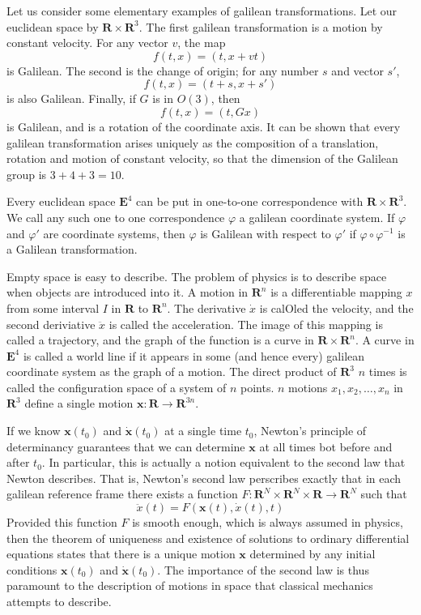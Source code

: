 Let us consider some elementary examples of galilean transformations. Let our euclidean space by $\mathbf{R} \times \mathbf{R}^3$. The first galilean transformation is a motion by constant velocity. For any vector $v$, the map
%
\[ f(t,x) = (t,x + vt) \]
%
is Galilean. The second is the change of origin; for any number $s$ and vector $s'$,
%
\[ f(t,x) = (t + s, x + s') \]
%
is also Galilean. Finally, if $G$ is in $O(3)$, then
%
\[ f(t,x) = (t, Gx) \]
%
is Galilean, and is a rotation of the coordinate axis. It can be shown that every galilean transformation arises uniquely as the composition of a translation, rotation and motion of constant velocity, so that the dimension of the Galilean group is $3 + 4 + 3 = 10$.

Every euclidean space $\mathbf{E}^4$ can be put in one-to-one correspondence with $\mathbf{R} \times \mathbf{R}^3$. We call any such one to one correspondence $\varphi$ a galilean coordinate system. If $\varphi$ and $\varphi'$ are coordinate systems, then $\varphi$ is Galilean with respect to $\varphi'$ if $\varphi \circ \varphi^{-1}$ is a Galilean transformation.

Empty space is easy to describe. The problem of physics is to describe space when objects are introduced into it. A motion in $\mathbf{R}^n$ is a differentiable mapping $x$ from some interval $I$ in $\mathbf{R}$ to $\mathbf{R}^n$. The derivative $\dot{x}$ is calOled the velocity, and the second deriviative $\ddot{x}$ is called the acceleration. The image of this mapping is called a trajectory, and the graph of the function is a curve in $\mathbf{R} \times \mathbf{R}^n$. A curve in $\mathbf{E}^4$ is called a world line if it appears in some (and hence every) galilean coordinate system as the graph of a motion. The direct product of $\mathbf{R}^3$ $n$ times is called the configuration space of a system of $n$ points. $n$ motions $x_1, x_2, \dots, x_n$ in $\mathbf{R}^3$ define a single motion $\mathbf{x}:\mathbf{R} \to \mathbf{R}^{3n}$.

If we know $\mathbf{x}(t_0)$ and $\dot{\mathbf{x}}(t_0)$ at a single time $t_0$, Newton's principle of determinancy guarantees that we can determine $\mathbf{x}$ at all times bot before and after $t_0$. In particular, this is actually a notion equivalent to the second law that Newton describes. That is, Newton's second law perscribes exactly that in each galilean reference frame there exists a function $F:\mathbf{R}^N \times \mathbf{R}^N \times \mathbf{R} \to \mathbf{R}^N$ such that
%
\[ \ddot{x}(t) = F(\mathbf{x}(t), \dot{x}(t), t) \]
%
Provided this function $F$ is smooth enough, which is always assumed in physics, then the theorem of uniqueness and existence of solutions to ordinary differential equations states that there is a unique motion $\mathbf{x}$ determined by any initial conditions $\mathbf{x}(t_0)$ and $\dot{\mathbf{x}}(t_0)$. The importance of the second law is thus paramount to the description of motions in space that classical mechanics attempts to describe.

